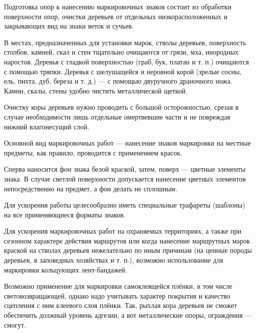 \documentclass[a4paper,12pt,titlepage]{extarticle}
\begin{document}
Подготовка опор к нанесению маркировочных знаков состоит из обработки поверхности опор, очистки деревьев от отдельных
низкорасположенных и закрывающих вид на знаки веток и сучьев.

В местах, предназначенных для установки марок, стволы деревьев, поверхность столбов, камней, скал и стен тщательно
очищаются от грязи, мха, инородных наростов. Деревья с гладкой поверхностью (граб, бук, платан и т. п.) очищаются с
помощью тряпки. Деревья с шелушащейся и неровной корой (зрелые сосны, ель, пихта, дуб, береза и т. д.) --- с помощью
двуручного драночного ножа. Камни, скалы, стены удобно чистить металлической щеткой.

Очистку коры деревьев нужно проводить с большой осторожностью, срезая в случае необходимости лишь отдельные омертвевшие
части и не повреждая нижний влагонесущий слой.

Основной вид маркировочных работ --- нанесение знаков маркировки на местные предметы, как правило, проводится с
применением красок.

Сперва наносится фон знака белой краской, затем, поверх --- цветные элементы знака. В случае светлой поверхности
допускается нанесение цветных элементов непосредственно на предмет, а фон делать не сплошным.

Для ускорения работы целесообразно иметь специальные трафареты (шаблоны) на все
применяющиеся форматы знаков.

Для ускорения маркировочных работ на охраняемых территориях, а также при сезонном характере действия маршрутов или когда
нанесение маршрутных марок краской на стволах деревьев нежелательно по иным причинам (на ценные породы деревьев, в
заповедных хозяйствах и т. п.), возможно использование для маркировки кольцующих лент-бандажей.

Возможно применение для маркировки самоклеящейся плёнки, в том числе световозвращающей, однако надо учитывать характер
покрытия и качество сцепления с ним клеевого слоя плёнки. Так, рыхлая кора деревьев не сможет обеспечить должный
уровень адгезии, а вот металлические опоры, ограждения --- смогут.
\end{document}
